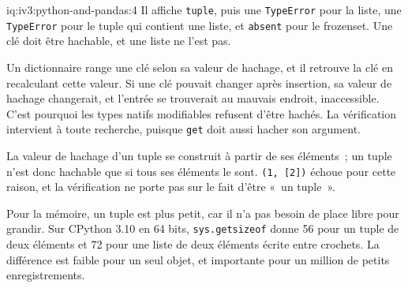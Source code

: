 \begin{solution}{iq:iv3:python-and-pandas:4}
Il affiche \texttt{tuple}, puis une \texttt{TypeError} pour la liste, une \texttt{TypeError} pour le tuple qui contient une liste, et \texttt{absent} pour le frozenset. Une clé doit être hachable, et une liste ne l'est pas.

Un dictionnaire range une clé selon sa valeur de hachage, et il retrouve la clé en recalculant cette valeur. Si une clé pouvait changer après insertion, sa valeur de hachage changerait, et l'entrée se trouverait au mauvais endroit, inaccessible. C'est pourquoi les types natifs modifiables refusent d'être hachés. La vérification intervient à toute recherche, puisque \texttt{get} doit aussi hacher son argument.

La valeur de hachage d'un tuple se construit à partir de ses éléments~; un tuple n'est donc hachable que si tous ses éléments le sont. \texttt{(1, [2])} échoue pour cette raison, et la vérification ne porte pas sur le fait d'être «~un tuple~».

Pour la mémoire, un tuple est plus petit, car il n'a pas besoin de place libre pour grandir. Sur CPython 3.10 en 64 bits, \texttt{sys.getsizeof} donne 56 pour un tuple de deux éléments et 72 pour une liste de deux éléments écrite entre crochets. La différence est faible pour un seul objet, et importante pour un million de petits enregistrements.

\end{solution}

